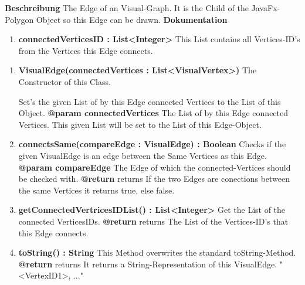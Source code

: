 				\textbf{Beschreibung}\newline
				The Edge of an Visual-Graph.
				It is the Child of the JavaFx-Polygon Object so this Edge can be drawn.
				\textbf{Dokumentation}\newline
				\begin{enumerate}[-]
					\item{
						\textbf{connectedVerticesID : List<Integer>} \newline
						This List contains all Vertices-ID's from the Vertices this Edge connects.
					}
				\end{enumerate}
				\begin{enumerate}[+]
					\item{
						\textbf{VisualEdge(connectedVertices : List<VisualVertex>)} \newline
						The Constructor of this Class.
						
						Set's the given List of by this Edge connected Vertices to the List of this Object.
						\newline
						\textbf{@param connectedVertices}
							The List of by this Edge connected Vertices.
							This given List will be set to the List of this Edge-Object.
							\newline
					}
					\item{
						\textbf{connectsSame(compareEdge : VisualEdge) : Boolean} \newline
						Checks if the given VisualEdge is an edge between the Same Vertices as this Edge.
						\newline
						\textbf{@param compareEdge}
							The Edge of which the connected-Vertices should be checked with.
							\newline
						\textbf{@return} returns
							If the two Edges are conections between the same Vertices it returns true, else false.
							\newline
					}
					\item{
						\textbf{getConnectedVertricesIDList() : List<Integer>} \newline
						Get the List of the connected VerticesIDs.
						\newline
						\textbf{@return} returns
							The List of the Vertices-ID's that this Edge connects.
							\newline
					}
					\item{
						\textbf{toString() : String} \newline
						This Method overwrites the standard toString-Method.
						\newline
						\textbf{@return} returns
							It returns a String-Representation of this VisualEdge.
							"{<VertexID1>, ...}"
							\newline
					}
				\end{enumerate}
			
